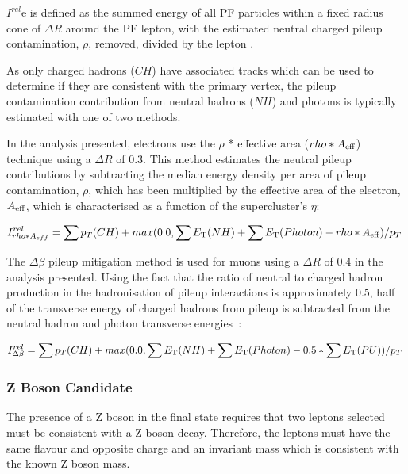 $I^{rel}$e is defined as the summed energy of all PF particles within a fixed radius cone of $\Delta R$ around the PF lepton, with the estimated neutral charged pileup contamination, $\rho$, removed, divided by the lepton \pT.

As only charged hadrons ($CH$) have associated tracks which can be used to determine if they are consistent with the primary vertex, the pileup contamination contribution from neutral hadrons ($NH$) and photons is typically estimated with one of two methods.

In the analysis presented, electrons use the $\rho$ * effective area ($rho * A_{\rm eff}$) technique using a $\Delta R$ of 0.3.
This method estimates the neutral pileup contributions by subtracting the median energy density per area of pileup contamination, $\rho$, which has been multiplied by the effective area of the electron, $A_{\rm eff}$, which is characterised as a function of the supercluster's $\eta$:

\begin{equation}
I^{rel}_{rho * A_{eff}} = \sum p_T(CH) + max (0.0, \sum E_{\rm T}(NH) + \sum E_{\rm T}(Photon) -rho*A_{\rm eff} )/p_T \;
\end{equation}\label{eq:rhoEffA}

The $\Delta\beta$ pileup mitigation method is used for muons using a $\Delta R$ of 0.4 in the analysis presented.
Using the fact that the ratio of neutral to charged hadron production in the hadronisation of pileup interactions is approximately 0.5, half of the transverse energy of charged hadrons from pileup is subtracted from the neutral hadron and photon transverse energies~\cite{Chatrchyan:2012vp}:

\begin{equation}
I^{rel}_{\Delta\beta} = \sum p_T(CH) + max (0.0, \sum E_{\rm T}(NH) + \sum E_{\rm T}(Photon) - 0.5 * \sum E_{\rm T}(PU))/p_T \;
\end{equation}\label{eq:deltaBeta}

\subsubsection{Z Boson Candidate}
The presence of a Z boson in the final state requires that two leptons selected must be consistent with a Z boson decay.
Therefore, the leptons must have the same flavour and opposite charge and an invariant mass which is consistent with the known Z boson mass.

